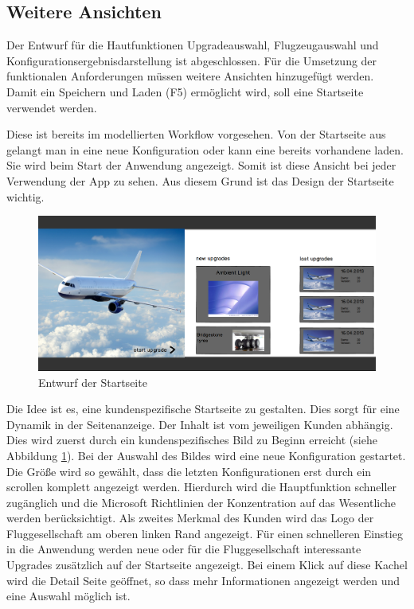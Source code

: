 \subsection{Weitere Ansichten}
Der Entwurf für die Hautfunktionen Upgradeauswahl, Flugzeugauswahl und Konfigurationsergebnisdarstellung ist abgeschlossen. Für die Umsetzung der funktionalen Anforderungen müssen weitere Ansichten hinzugefügt werden. Damit ein Speichern und Laden (F5) ermöglicht wird, soll eine Startseite verwendet werden. 

Diese ist bereits im modellierten Workflow vorgesehen. Von der Startseite aus gelangt man in eine neue Konfiguration oder kann eine bereits vorhandene laden. Sie wird beim Start der Anwendung angezeigt. Somit ist diese Ansicht bei jeder Verwendung der App zu sehen. Aus diesem Grund ist das Design der Startseite wichtig. \par
\begin{figure}[H]
\centering
\includegraphics[width=\hsize]{images/start_entwurf}
\caption{Entwurf der Startseite}
\label{startSketch}
\end{figure}
Die Idee ist es, eine kundenspezifische Startseite zu gestalten. Dies sorgt für eine Dynamik in der Seitenanzeige. Der Inhalt ist vom jeweiligen Kunden abhängig. Dies wird zuerst durch ein kundenspezifisches Bild zu Beginn erreicht (siehe Abbildung \ref{startSketch}). Bei der Auswahl des Bildes wird eine neue Konfiguration gestartet. Die Größe wird so gewählt, dass die letzten Konfigurationen erst durch ein scrollen komplett angezeigt werden. Hierdurch wird die Hauptfunktion schneller zugänglich und  die Microsoft Richtlinien der Konzentration auf das Wesentliche werden berücksichtigt. Als zweites Merkmal des Kunden wird das Logo der Fluggesellschaft am oberen linken Rand angezeigt. Für einen schnelleren Einstieg in die Anwendung werden neue oder für die Fluggesellschaft interessante Upgrades zusätzlich auf der Startseite angezeigt. Bei einem Klick auf diese Kachel wird die Detail Seite geöffnet, so dass mehr Informationen angezeigt werden und eine Auswahl möglich ist. 
\par 

